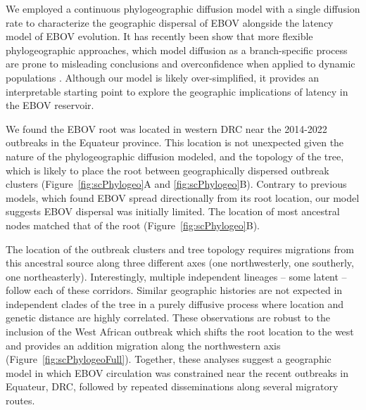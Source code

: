 \documentclass[11pt,a4paper]{article}
\begin{document}
We employed a continuous phylogeographic diffusion model with a single diffusion rate to characterize the geographic dispersal of EBOV alongside the latency model of EBOV evolution.
It has recently been show that more flexible phylogeographic approaches, which model diffusion as a branch-specific process are prone to misleading conclusions and overconfidence when applied to dynamic populations  \cite{Neher2025-ka}.
Although our model is likely over-simplified, it provides an interpretable starting point to explore the geographic implications of latency in the EBOV reservoir.

We found the EBOV root was located in western DRC near the 2014-2022 outbreaks in the Equateur province. 
This location is not unexpected given the nature of the phylogeographic diffusion modeled, and the topology of the tree, which is likely to place the root between geographically dispersed outbreak clusters (Figure~\ref{fig:scPhylogeo}A and \ref{fig:scPhylogeo}B).
Contrary to previous models, which found EBOV spread directionally from its root location, our model suggests EBOV dispersal was initially limited.
The location of most ancestral nodes matched that of the root (Figure~\ref{fig:scPhylogeo}B).

The location of the outbreak clusters and tree topology requires migrations from this ancestral source along three different axes (one northwesterly, one southerly, one northeasterly).
Interestingly, multiple independent lineages -- some latent -- follow each of these corridors. 
Similar geographic histories are not expected in independent clades of the tree in a purely diffusive process where location and genetic distance are highly correlated. 
These observations are robust to the inclusion of the West African outbreak which shifts the root location to the west and provides an addition migration along the northwestern axis (Figure~\ref{fig:scPhylogeoFull}).
Together, these analyses suggest a geographic model in which EBOV circulation was constrained near the recent outbreaks in Equateur, DRC, followed by repeated disseminations along several migratory routes.
\end{document}
